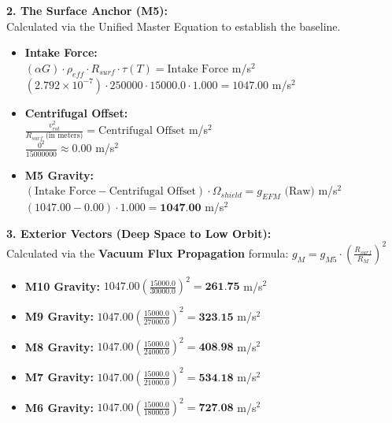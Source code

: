\documentclass[11pt, a4paper]{article}
\begin{document}
  \vspace{1.0em}
  \noindent \textbf{2. The Surface Anchor (M5):} \\
  \hspace*{1em} Calculated via the Unified Master Equation to establish the baseline.
  \begin{itemize}
    \item \textbf{Intake Force:} \\[0.5em]
    \hspace*{2em} $(\alpha G) \cdot \rho_{eff} \cdot R_{surf} \cdot \tau(T) = \text{Intake Force}$ m/s$^2$ \\[1em]
    \hspace*{2em} $(2.792 \times 10^{-7}) \cdot 250000 \cdot 15000.0 \cdot 1.000 = 1047.00$ m/s$^2$
    
    \item \textbf{Centrifugal Offset:} \\[0.5em]
    \hspace*{2em} $\frac{v_{rot}^2}{R_{surf} \text{ (in meters)}} = \text{Centrifugal Offset}$ m/s$^2$ \\[1em]
    \hspace*{2em} $\frac{0^2}{15000000} \approx 0.00$ m/s$^2$
    
    \item \textbf{M5 Gravity:} \\[0.5em]
    \hspace*{2em} $(\text{Intake Force} - \text{Centrifugal Offset}) \cdot \Omega_{shield} = g_{EFM} \text{ (Raw)}$ m/s$^2$ \\[1em]
    \hspace*{2em} $(1047.00 - 0.00) \cdot 1.000 = \textbf{1047.00}$ m/s$^2$
  \end{itemize}

  \clearpage
  \noindent \textbf{3. Exterior Vectors (Deep Space to Low Orbit):} \\
  \hspace*{1em} Calculated via the \textbf{Vacuum Flux Propagation} formula: $g_M = g_{M5} \cdot \left( \frac{R_{surf}}{R_M} \right)^2$
  \begin{itemize}
    \item \textbf{M10 Gravity:} $1047.00 \left( \frac{15000.0}{30000.0} \right)^2 = \textbf{261.75}$ m/s$^2$
    \item \textbf{M9 Gravity:} $1047.00 \left( \frac{15000.0}{27000.0} \right)^2 = \textbf{323.15}$ m/s$^2$
    \item \textbf{M8 Gravity:} $1047.00 \left( \frac{15000.0}{24000.0} \right)^2 = \textbf{408.98}$ m/s$^2$
    \item \textbf{M7 Gravity:} $1047.00 \left( \frac{15000.0}{21000.0} \right)^2 = \textbf{534.18}$ m/s$^2$
    \item \textbf{M6 Gravity:} $1047.00 \left( \frac{15000.0}{18000.0} \right)^2 = \textbf{727.08}$ m/s$^2$
  \end{itemize}
\end{document}
